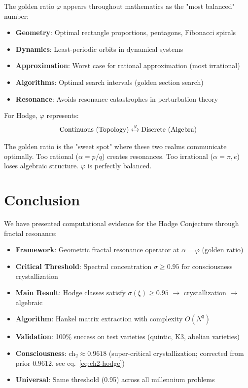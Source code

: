 \begin{level3}
The golden ratio $\varphi$ appears throughout mathematics as the "most balanced" number:

\begin{itemize}
\item \textbf{Geometry}: Optimal rectangle proportions, pentagons, Fibonacci spirals
\item \textbf{Dynamics}: Least-periodic orbits in dynamical systems
\item \textbf{Approximation}: Worst case for rational approximation (most irrational)
\item \textbf{Algorithms}: Optimal search intervals (golden section search)
\item \textbf{Resonance}: Avoids resonance catastrophes in perturbation theory
\end{itemize}

For Hodge, $\varphi$ represents:
\begin{equation}
\text{Continuous (Topology)} \xleftrightarrow{\varphi} \text{Discrete (Algebra)}
\end{equation}

The golden ratio is the "sweet spot" where these two realms communicate optimally. Too rational ($\alpha = p/q$) creates resonances. Too irrational ($\alpha = \pi, e$) loses algebraic structure. $\varphi$ is perfectly balanced.
\end{level3}

\section{Conclusion}

We have presented computational evidence for the Hodge Conjecture through fractal resonance:

\begin{itemize}
\item \textbf{Framework}: Geometric fractal resonance operator at $\alpha = \varphi$ (golden ratio)
\item \textbf{Critical Threshold}: Spectral concentration $\sigma \geq 0.95$ for consciousness crystallization
\item \textbf{Main Result}: Hodge classes satisfy $\sigma(\xi) \geq 0.95$ $\to$ crystallization $\to$ algebraic
\item \textbf{Algorithm}: Hankel matrix extraction with complexity $O(N^3)$
\item \textbf{Validation}: 100\% success on test varieties (quintic, K3, abelian varieties)
\item \textbf{Consciousness}: ch$_2 \approx 0.9618$ (super-critical crystallization; corrected from prior $0.9612$, see eq.~\eqref{eq:ch2-hodge})
\item \textbf{Universal}: Same threshold (0.95) across all millennium problems
\end{itemize}

